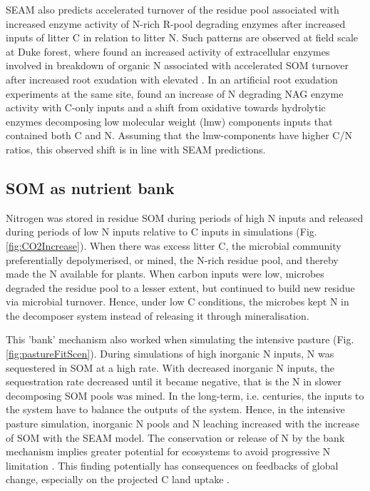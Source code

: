 SEAM also predicts accelerated turnover of the residue pool associated with
increased enzyme activity of N-rich R-pool degrading enzymes after increased
inputs of litter C in relation to litter N.
Such patterns are observed at field scale at Duke forest, where
\citet{Phillips11} found an increased activity of extracellular enzymes involved
in breakdown of organic N associated with accelerated SOM turnover after
increased root exudation with elevated . In an artificial
root exudation experiments at the same site, \citet{Drake13} found an increase of N
degrading NAG enzyme activity with C-only inputs and a shift from oxidative
towards hydrolytic enzymes decomposing low molecular weight (lmw) components
inputs that contained both C and N.
Assuming that the lmw-components have higher C/N ratios, this observed shift
is in line with SEAM predictions.

\subsection{SOM as nutrient bank}
Nitrogen was stored in residue SOM during periods of high N inputs and released
during periods of low N inputs relative to C inputs in simulations (Fig.
\ref{fig:CO2Increase}). When there was excess litter C, the microbial
community preferentially depolymerised, or mined, the N-rich residue pool, and thereby
made the N available for plants. When carbon inputs were low, microbes degraded
the residue pool to a lesser extent, but continued to build new residue via
microbial turnover. Hence, under low C conditions, the microbes kept N in the
decomposer system instead of releasing it through mineralisation.

This 'bank' mechanism \citep[sensu][]{Perveen14} also worked when simulating the
intensive pasture (Fig. \ref{fig:pastureFitScen}). During simulations of high
inorganic N inputs, N was sequestered in SOM at a high rate. With decreased
inorganic N inputs, the sequestration rate decreased until it became negative,
that is the N in slower decomposing SOM pools was mined. In the
long-term, i.e.
centuries, the inputs to the system have to balance the outputs of the system. Hence, in
the intensive pasture simulation, inorganic N pools and N leaching increased with
the increase of SOM with the SEAM model. The conservation or release of N by the
bank mechanism implies greater potential for ecosystems to avoid progressive N
limitation \citep{Norby10, Franklin14, Averill15}. This finding
potentially has consequences on feedbacks of global change, especially on the
projected C land uptake \citep{Friedlingstein14}.

